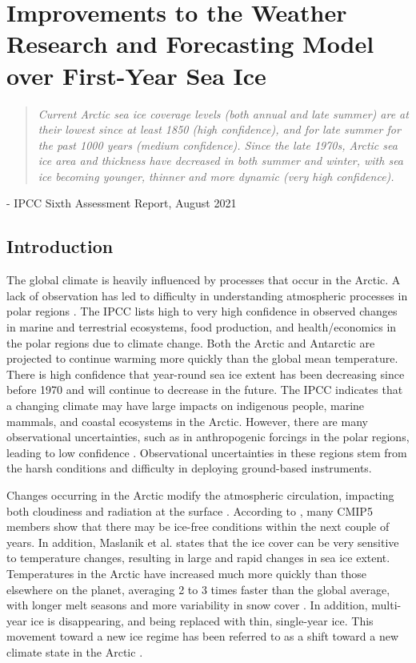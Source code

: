 \chapter{Improvements to the Weather Research and Forecasting Model over First-Year Sea Ice}
\vspace{1 cm}
\begin{spacing}{1} \begin{quote} 
\noindent \emph{Current Arctic sea ice coverage levels (both annual and late summer) are at their lowest since at least 1850 (high confidence), and for late summer for the past 1000 years (medium confidence). Since the late 1970s, Arctic sea ice area and thickness have decreased in both summer and winter, with sea ice becoming younger, thinner and more dynamic (very high confidence).}\end{quote}
\hspace{6 cm} - IPCC Sixth Assessment Report, August 2021  
\end{spacing}
\doublespacing
\section{Introduction}

The global climate is heavily influenced by processes that occur in the Arctic. A lack of observation has led to difficulty in understanding atmospheric processes in polar regions \citep{persson:2002}. The IPCC \citep{IPCC:14} lists high to very high confidence in observed changes in marine and terrestrial ecosystems, food production, and health/economics in the polar regions due to climate change. Both the Arctic and Antarctic are projected to continue warming more quickly than the global mean temperature. There is high confidence that year-round sea ice extent has been decreasing since before 1970 and will continue to decrease in the future. The IPCC \citep{IPCC:14} indicates that a changing climate may have large impacts on indigenous people, marine mammals, and coastal ecosystems in the Arctic. However, there are many observational uncertainties, such as in anthropogenic forcings in the polar regions, leading to low confidence \citep{IPCC:14}. Observational uncertainties in these regions stem from the harsh conditions and difficulty in deploying ground-based instruments.

Changes occurring in the Arctic modify the atmospheric circulation, impacting both cloudiness and radiation at the surface \citep{zhang:2008}. According to \citet{stroeve:2007}, many CMIP5 members show that there may be ice-free conditions within the next couple of years. In addition, Maslanik et al. \citep{maslanik:2007} states that the ice cover can be very sensitive to temperature changes, resulting in large and rapid changes in sea ice extent. Temperatures in the Arctic have increased much more quickly than those elsewhere on the planet, averaging 2 to 3 times faster than the global average, with longer melt seasons and more variability in snow cover \citep{sledd:2019, AACI:05}. In addition, multi-year ice is disappearing, and being replaced with thin, single-year ice. This movement toward a new ice regime has been referred to as a shift toward a new climate state in the Arctic \citep{verlinde:2007}.  

